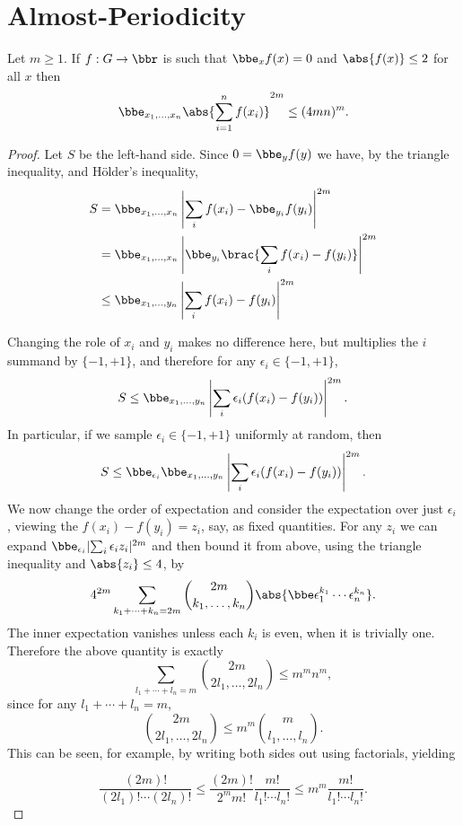 
\chapter{Almost-Periodicity}
\label{chap:ap}


\begin{lemma}
\label{mzi}
\leanok
Let $m\geq 1$. If $f:G\to\bbr$ is such that $\bbe_x f(x)=0$ and $\abs{f(x)}\leq 2$ for all $x$ then
\[\bbe_{x_1,\ldots,x_n} \abs{\sum_{i=1}^n f(x_i)}^{2m} \leq (4mn)^{m}.\]
\end{lemma}

\begin{proof}
\leanok
Let $S$ be the left-hand side. Since $0=\bbe_y f(y)$ we have, by the triangle inequality, and H\"{o}lder's inequality,
\begin{align}
  S
  & = \bbe_{x_1, \dots, x_n}\left\lvert \sum_i f(x_i) - \bbe_{y_i} f(y_i)\right\rvert^{2m} \\
  & = \bbe_{x_1, \dots, x_n} \left\lvert\bbe_{y_i}\brac{\sum_i f(x_i) - f(y_i)}\right\rvert^{2m} \\
  & \le \bbe_{x_1,\dots,y_n} \left\lvert \sum_i f(x_i) - f(y_i)\right\rvert^{2m}
\end{align}

Changing the role of $x_i$ and $y_i$ makes no difference here, but multiplies the $i$ summand by $\{-1,+1\}$, and therefore for any $\epsilon_i\in\{-1,+1\}$,
\[ S \leq\bbe_{x_1,\ldots,y_n}\left\lvert \sum_i \epsilon_i(f(x_i)-f(y_i))\right\rvert^{2m}.\]
In particular, if we sample $\epsilon_i\in\{-1,+1\}$ uniformly at random, then
\[ S \leq\bbe_{\epsilon_i} \bbe_{x_1,\ldots,y_n}\left\lvert \sum_i \epsilon_i(f(x_i)-f(y_i))\right\rvert^{2m}.\]
We now change the order of expectation and consider the expectation over just $\epsilon_i$, viewing the $f(x_i)-f(y_i)=z_i$, say, as fixed quantities. For any $z_i$ we can expand $\bbe_{\epsilon_i} \lvert \sum_i \epsilon_iz_i\rvert^{2m}$ and then bound it from above, using the triangle inequality and $\abs{z_i}\leq 4$, by
\[4^{2m}\sum_{k_1+\cdots+k_n=2m}\binom{2m}{k_1,\ldots,k_n}\abs{\bbe\epsilon_1^{k_1}\cdots \epsilon_n^{k_n}}.\]
The inner expectation vanishes unless each $k_i$ is even, when it is trivially one. Therefore the above quantity is exactly
\[\sum_{l_1+\cdots+l_n=m}\binom{2m}{2l_1,\ldots,2l_n}\leq m^mn^m,\]
since for any $l_1+\cdots+l_n=m$,
\[\binom{2m}{2l_1,\ldots,2l_n}\leq m^m\binom{m}{l_1,\ldots,l_n}.\]
This can be seen, for example, by writing both sides out using factorials, yielding

\[\frac{(2m)!}{(2l_1)!\cdots (2l_n)!}\leq \frac{(2m)!}{2^mm!}\frac{m!}{l_1!\cdots l_n!}\leq m^m\frac{m!}{l_1!\cdots l_n!}.\]
\end{proof}


